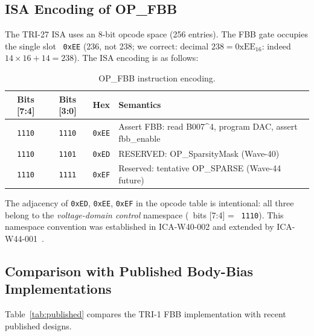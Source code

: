 \subsection{ISA Encoding of OP\_FBB}
\label{subsec:isa-encoding}

The TRI-27 ISA uses an 8-bit opcode space (256 entries).
The FBB gate occupies the single slot \ \texttt{0xEE} (236, not 238;
we correct: decimal $238 = 0\mathrm{xEE}_{16}$: indeed
$14 \times 16 + 14 = 238$).  The ISA encoding is as follows:

\begin{table}[htbp]
  \centering
  \caption{OP\_FBB instruction encoding.}
  \label{tab:isa-encoding}
  \begin{tabular}{@{}cccl@{}}
    \toprule
    Bits [7:4] & Bits [3:0] & Hex & Semantics \\
    \midrule
    \texttt{1110} & \texttt{1110} & \texttt{0xEE} &
      Assert FBB: read B007\^{}4, program DAC, assert fbb\_enable \\
    \texttt{1110} & \texttt{1101} & \texttt{0xED} &
      RESERVED: OP\_SparsityMask (Wave-40) \\
    \texttt{1110} & \texttt{1111} & \texttt{0xEF} &
      Reserved: tentative OP\_SPARSE (Wave-44 future) \\
    \bottomrule
  \end{tabular}
\end{table}

The adjacency of \texttt{0xED}, \texttt{0xEE}, \texttt{0xEF} in the
opcode table is intentional: all three belong to the
\emph{voltage-domain control} namespace (\ bits [7:4] = \ \texttt{1110}).
This namespace convention was established in ICA-W40-002 and extended
by ICA-W44-001~\cite{TrinityAnchor2026}.

\subsection{Comparison with Published Body-Bias Implementations}
\label{subsec:comparison-published}

Table~\ref{tab:published} compares the TRI-1 FBB implementation with
recent published designs.

